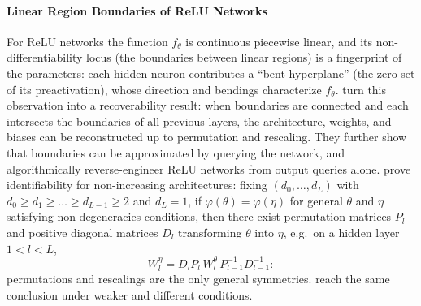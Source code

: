 \documentclass[mathematics,review,submit,moreauthors]{Definitions/mdpi}
\begin{document}
\paragraph{Linear Region Boundaries of ReLU Networks}
For ReLU networks the function $f_\theta$ is continuous piecewise linear, and its non-differentiability locus (the boundaries between linear regions) is a fingerprint of the parameters: each hidden neuron contributes a ``bent hyperplane'' (the zero set of its preactivation), whose direction and bendings characterize $f_\theta$.
\citet{rolnick2020p3icml} turn this observation into a recoverability result: when boundaries are connected and each intersects the boundaries of all previous layers, the architecture, weights, and biases can be reconstructed up to permutation and rescaling.
They further show that boundaries can be approximated by querying the network, and algorithmically reverse-engineer ReLU networks from output queries alone.
\citet{phuong2019} prove identifiability for non-increasing architectures: fixing $(d_0,\dots,d_L)$ with $d_0\ge d_1\ge\dots\ge d_{L-1}\ge 2$ and $d_L=1$, if $\varphi(\theta)=\varphi(\eta)$ for general $\theta$ and $\eta$ satisfying non-degeneracies conditions, then there exist permutation matrices $P_l$ and positive diagonal matrices $D_l$ transforming $\theta$ into $\eta$, e.g.\ on a hidden layer $1<l<L$,
\begin{equation*}
    W_l^{\eta}=D_lP_l\,W_l^{\theta}\,P_{l-1}^{-1}D_{l-1}^{-1}:
\end{equation*}
permutations and rescalings are the only general symmetries.
\citet{bona-pellissier2023} reach the same conclusion under weaker and different conditions.
\end{document}
